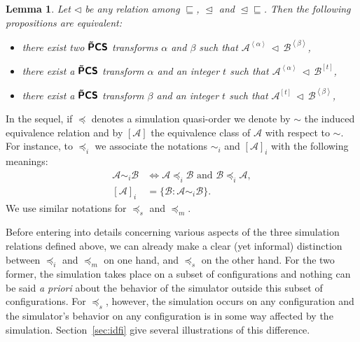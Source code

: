 \documentclass[a4paper]{elsarticle}
\def\qed{\relax\ifmmode\hskip2em \blacksquare\else\unskip\nobreak\hfill\hskip1em $\blacksquare$\fi}
\newcommand{\ACA}{\mathcal{A}}
\newcommand{\ACB}{\mathcal{B}}
\newcommand\sfbop[1]{\operatorname{\hbox{\usefont{T1}{cmss}{bx}{n}#1}}}
\newcommand\tPmCS{\sfbop{\~{P}CS}}
\newcommand\sac{\sqsubseteq}
\newcommand{\fac}{\trianglelefteq}
\newcommand{\facsac}{\fac\!\sac}
\newcommand\bulk[2]{{#1}^{\left\langle{#2}\right\rangle}}
\newcommand{\simu}{\preccurlyeq}
\newcommand{\sacsimu}{\simu_i}
\newcommand{\facsimu}{\simu_s}
\newcommand{\facsacsimu}{\simu_m}
\newcommand{\sime}{\sim}
\newcommand{\sacsime}{\sime_i}
\newcommand{\simc}[1]{\left[{#1}\right]}
\newcommand{\sacsimc}[1]{\left[{#1}\right]_i}
\newcommand\grp[2]{{#1}^{[#2]}}
\newtheorem{lm}{Lemma}[section]
\begin{document}
\begin{lm}
  \label{lem:mapa}
  Let $\triangleleft$ be any relation among $\sac$, $\fac$ and $\facsac$. Then the following
  propositions are equivalent:
  \begin{itemize}
  \item there exist two $\tPmCS$ transforms $\alpha$ and $\beta$ such that
    ${\bulk{\ACA}{\alpha}\,\triangleleft\,\bulk{\ACB}{\beta}}$,
  \item there exist a $\tPmCS$ transform $\alpha$ and an integer $t$ such that
    ${\bulk{\ACA}{\alpha}\,\triangleleft\,\grp{\ACB}{t}}$,
  \item there exist a $\tPmCS$ transform $\beta$ and an integer $t$ such that
    ${\grp{\ACA}{t}\,\triangleleft\,\bulk{\ACB}{\beta}}$,
  \end{itemize}
\end{lm}
\newcommand\trsfo[1]{\left\langle #1, 0\right\rangle}


In the sequel, if $\simu$ denotes a simulation quasi-order we denote
by $\sime$ the induced equivalence relation and by $\simc{\ACA}$ the
equivalence class of $\ACA$ with respect to $\sime$. For instance, to
$\sacsimu$ we associate the notations $\sacsime$ and
$\sacsimc{\ACA}$ with the following meanings:
\begin{align*}
  \ACA\sacsime\ACB &\iff \ACA\sacsimu\ACB\text{ and }\ACB\sacsimu\ACA,\\
  \sacsimc{\ACA} &= \{\ACB : \ACA\sacsime\ACB\}.
\end{align*}
 We use similar notations for $\facsimu$ and
$\facsacsimu$.



Before entering into details concerning various aspects of the three
simulation relations defined above, we can already make a clear (yet
informal) distinction between $\sacsimu$ and $\facsacsimu$ on one hand,
and $\facsimu$ on the other hand. For the two former, the simulation
takes place on a subset of configurations and nothing can be said
\textit{a priori} about the behavior of the simulator outside this
subset of configurations. For $\facsimu$, however, the simulation
occurs on any configuration and the simulator's behavior on any
configuration is in some way affected by the
simulation. Section~\ref{sec:idfi} give several illustrations of this
difference.
\end{document}
